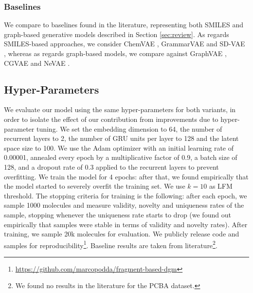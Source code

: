 \subsubsection*{Baselines}
We compare to baselines found in the literature, representing both SMILES and graph-based generative models described in Section \ref{sec:review}. As regards SMILES-based approaches, we consider ChemVAE \citep{gomez2018vaemolecule}, GrammarVAE \citep{kusner2017grammarvae} and SD-VAE \citep{dai2018sdvae}, whereas as regards graph-based models, we compare against GraphVAE \citep{simonovsky2018graphvae}, CGVAE \citep{liu2018cgvae} and NeVAE \citep{samanta2019nevae}.

\subsection{Hyper-Parameters}
We evaluate our model using the same hyper-parameters for both variants, in order to isolate the effect of our contribution from improvements due to hyper-parameter tuning. We set the embedding dimension to 64, the number of recurrent layers to 2, the number of GRU units per layer to 128 and the latent space size to 100. We use the Adam optimizer with an initial learning rate of 0.00001, annealed every epoch by a multiplicative factor of 0.9, a batch size of 128, and a dropout rate of 0.3 applied to the recurrent layers to prevent overfitting. We train the model for 4 epochs: after that, we found empirically that the model started to severely overfit the training set. We use $k=10$ as LFM threshold. The stopping criteria for training is the following: after each epoch, we sample 1000 molecules and measure validity, novelty and uniqueness rates of the sample, stopping whenever the uniqueness rate starts to drop (we found out empirically that samples were stable in terms of validity and novelty rates). After training, we sample 20k molecules for evaluation. We publicly release code and samples for reproducibility\footnote{\url{https://github.com/marcopodda/fragment-based-dgm}}. Baseline results are taken from literature\footnote{We found no results in the literature for the PCBA dataset.}.

